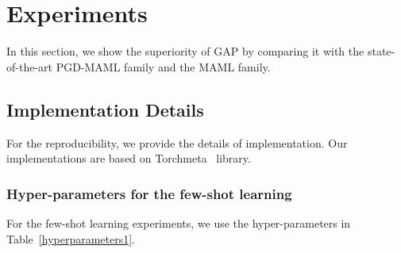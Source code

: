 \section{Experiments}
In this section, we show the superiority of GAP by comparing it with the state-of-the-art PGD-MAML family and the MAML family. 

\subsection{Implementation Details}
For the reproducibility, we provide the details of implementation. Our implementations are based on Torchmeta~\cite{deleu2019torchmeta} library. 

\subsubsection{Hyper-parameters for the few-shot learning}
\label{sec:5.1.1}
For the few-shot learning experiments, we use the hyper-parameters in Table~\ref{hyperparameters1}.
\begin{table}[h!]
  \caption{Hyper-parameters used for training GAP on various few-shot learning experiments.}
  \centering
  \label{hyperparameters1}
\end{table}

